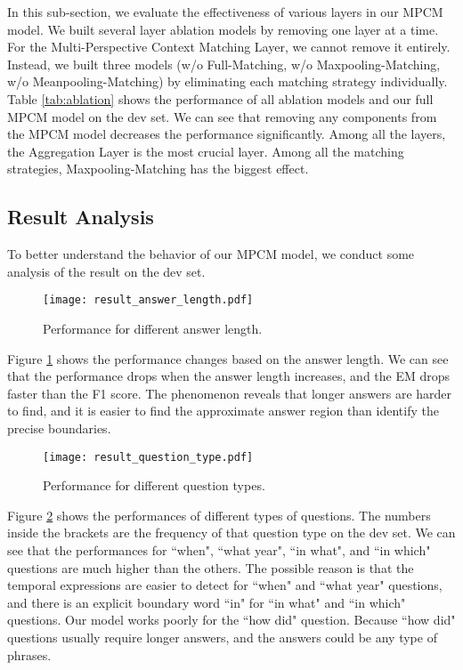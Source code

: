 \documentclass[11pt,letterpaper]{article}
\begin{document}
In this sub-section, we evaluate the effectiveness of various layers in our MPCM model. We built several layer ablation models by removing one layer at a time. For the Multi-Perspective Context Matching Layer, we cannot remove it entirely. Instead, we built three models (w/o Full-Matching, w/o Maxpooling-Matching, w/o Meanpooling-Matching) by eliminating each matching strategy individually. Table \ref{tab:ablation} shows the performance of all ablation models and our full MPCM model on the dev set. We can see that removing any components from the MPCM model decreases the performance significantly. Among all the layers, the Aggregation Layer is the most crucial layer. Among all the matching strategies, Maxpooling-Matching has the biggest effect.


\subsection{Result Analysis}
To better understand the behavior of our MPCM model, we conduct some analysis of the result on the dev set.

\begin{figure}[tbp]
\begin{center}
\texttt{[image: result\_answer\_length.pdf]}
\end{center}
\caption{Performance for different answer length.}
\label{fig:answer_length}
\end{figure}

Figure \ref{fig:answer_length} shows the performance changes based on the answer length. We can see that the performance drops when the answer length increases, and the EM drops faster than the F1 score. The phenomenon reveals that longer answers are harder to find, and it is easier to find the approximate answer region than identify the precise boundaries.

\begin{figure}[tbp]
\begin{center}
\texttt{[image: result\_question\_type.pdf]}
\end{center}
\caption{Performance for different question types.}
\label{fig:question_type}
\end{figure}

Figure \ref{fig:question_type} shows the performances of different types of questions. The numbers inside the brackets are the frequency of that question type on the dev set. We can see that the performances for ``when", ``what year", ``in what",  and ``in which" questions are much higher than the others. The possible reason is that the temporal expressions are easier to detect for  ``when" and ``what year" questions, and there is an explicit boundary word ``in" for ``in what"  and ``in which" questions. Our model works poorly for the ``how did" question. Because ``how did" questions usually require longer answers, and the answers could be any type of phrases.
\end{document}
